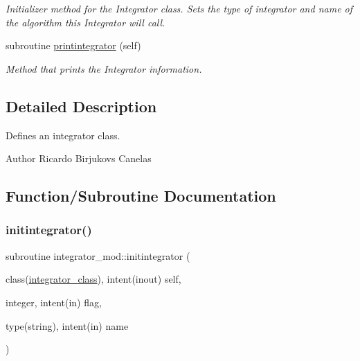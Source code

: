 \begin{DoxyCompactItemize}
\begin{DoxyCompactList}\small\item\em Initializer method for the Integrator class. Sets the type of integrator and name of the algorithm this Integrator will call. \end{DoxyCompactList}\item 
subroutine \mbox{\hyperlink{namespaceintegrator__mod_a6c1df4442c3a9bdef68a4f2f95a403cd}{printintegrator}} (self)
\begin{DoxyCompactList}\small\item\em Method that prints the Integrator information. \end{DoxyCompactList}\end{DoxyCompactItemize}


\subsection{Detailed Description}
Defines an integrator class. 

\begin{DoxyAuthor}{Author}
Ricardo Birjukovs Canelas 
\end{DoxyAuthor}


\subsection{Function/\+Subroutine Documentation}
\mbox{\label{namespaceintegrator__mod_acb397b27678b3fb5f9d6b0021b5ab058}} 
\subsubsection{\texorpdfstring{initintegrator()}{initintegrator()}}
{\footnotesize\ttfamily subroutine integrator\+\_\+mod\+::initintegrator (\begin{DoxyParamCaption}\item[{class(\mbox{\hyperlink{structintegrator__mod_1_1integrator__class}{integrator\+\_\+class}}), intent(inout)}]{self,  }\item[{integer, intent(in)}]{flag,  }\item[{type(string), intent(in)}]{name }\end{DoxyParamCaption})\hspace{0.3cm}{\ttfamily [private]}}



